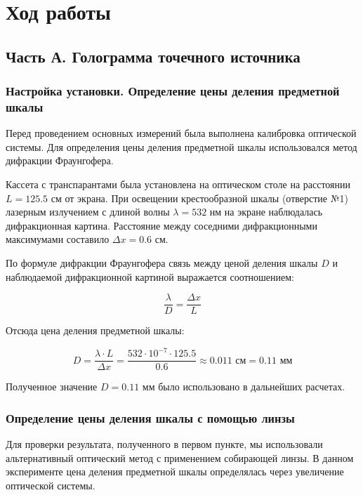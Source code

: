 \section{Ход работы}

\subsection{Часть А. Голограмма точечного источника}

\subsubsection{Настройка установки. Определение цены деления предметной шкалы}

Перед проведением основных измерений была выполнена калибровка оптической системы. Для определения цены деления предметной шкалы использовался метод дифракции Фраунгофера. 

Кассета с транспарантами была установлена на оптическом столе на расстоянии $L = 125.5$ см от экрана. При освещении крестообразной шкалы (отверстие №1) лазерным излучением с длиной волны $\lambda = 532$ нм на экране наблюдалась дифракционная картина. Расстояние между соседними дифракционными максимумами составило $\Delta x = 0.6$ см.

По формуле дифракции Фраунгофера связь между ценой деления шкалы $D$ и наблюдаемой дифракционной картиной выражается соотношением:

\begin{equation}
    \frac{\lambda}{D} = \frac{\Delta x}{L}
\end{equation}

Отсюда цена деления предметной шкалы:

\begin{equation}
    D = \frac{\lambda \cdot L}{\Delta x} = \frac{532 \cdot 10^{-7} \cdot 125.5}{0.6} \approx 0.011 \text{ см} = 0.11 \text{ мм}
\end{equation}

Полученное значение $D = 0.11$ мм было использовано в дальнейших расчетах.

\subsubsection{Определение цены деления шкалы с помощью линзы}

Для проверки результата, полученного в первом пункте, мы использовали альтернативный оптический метод с применением собирающей линзы. В данном эксперименте цена деления предметной шкалы определялась через увеличение оптической системы.

